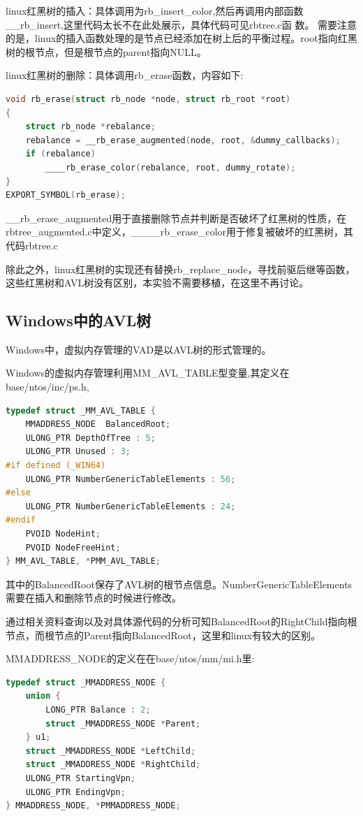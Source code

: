 linux红黑树的插入：具体调用为rb\_insert\_color,然后再调用内部函数\_\_rb\_insert,这里代码太长不在此处展示，具体代码可见rbtree.c函 数。
需要注意的是，linux的插入函数处理的是节点已经添加在树上后的平衡过程。root指向红黑树的根节点，但是根节点的parent指向NULL。

linux红黑树的删除：具体调用rb\_erase函数，内容如下:

\begin{lstlisting}[language=C]
void rb_erase(struct rb_node *node, struct rb_root *root)
{
	struct rb_node *rebalance;
	rebalance = __rb_erase_augmented(node, root, &dummy_callbacks);
	if (rebalance)
		____rb_erase_color(rebalance, root, dummy_rotate);
}
EXPORT_SYMBOL(rb_erase);
\end{lstlisting}
\_\_rb\_erase\_augmented用于直接删除节点并判断是否破坏了红黑树的性质，在rbtree\_augmented.c中定义，\_\_\_\_rb\_erase\_color用于修复被破坏的红黑树，其代码rbtree.c

除此之外，linux红黑树的实现还有替换rb\_replace\_node，寻找前驱后继等函数，这些红黑树和AVL树没有区别，本实验不需要移植，在这里不再讨论。

\subsection{Windows中的AVL树}
Windows中，虚拟内存管理的VAD是以AVL树的形式管理的。

Windows的虚拟内存管理利用MM\_AVL\_TABLE型变量,其定义在base/ntos/inc/ps.h,
\begin{lstlisting}[language=C]
typedef struct _MM_AVL_TABLE {
	MMADDRESS_NODE  BalancedRoot;
	ULONG_PTR DepthOfTree : 5;
	ULONG_PTR Unused : 3;
#if defined (_WIN64)
	ULONG_PTR NumberGenericTableElements : 56;
#else
	ULONG_PTR NumberGenericTableElements : 24;
#endif
	PVOID NodeHint;
	PVOID NodeFreeHint;
} MM_AVL_TABLE, *PMM_AVL_TABLE;
\end{lstlisting}

其中的BalancedRoot保存了AVL树的根节点信息。NumberGenericTableElements需要在插入和删除节点的时候进行修改。

通过相关资料查询以及对具体源代码的分析可知BalancedRoot的RightChild指向根节点，而根节点的Parent指向BalancedRoot，这里和linux有较大的区别。

MMADDRESS\_NODE的定义在在base/ntos/mm/mi.h里:
\begin{lstlisting}[language=C]
typedef struct _MMADDRESS_NODE {
	union {
		LONG_PTR Balance : 2;
		struct _MMADDRESS_NODE *Parent;
	} u1;
	struct _MMADDRESS_NODE *LeftChild;
	struct _MMADDRESS_NODE *RightChild;
	ULONG_PTR StartingVpn;
	ULONG_PTR EndingVpn;
} MMADDRESS_NODE, *PMMADDRESS_NODE;
\end{lstlisting}

